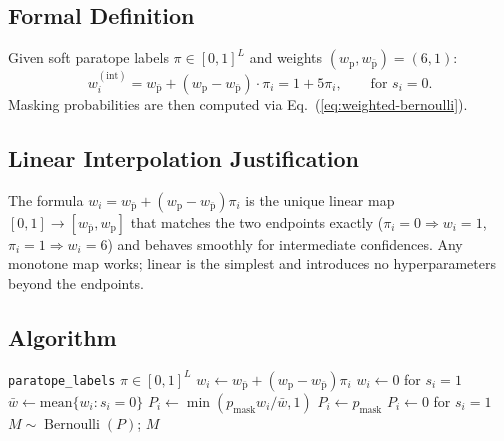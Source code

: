 \documentclass[11pt]{article}
\newcommand{\pmask}{p_{\text{mask}}}
\DeclareMathOperator{\Bern}{Bernoulli}
\begin{document}
\subsection{Formal Definition}
Given soft paratope labels $\pi \in [0,1]^L$ and weights
$(w_{\text{p}}, w_{\bar{\text{p}}}) = (6, 1)$:
\begin{equation}
w^{(\text{int})}_i = w_{\bar{\text{p}}} + (w_{\text{p}} - w_{\bar{\text{p}}}) \cdot \pi_i
= 1 + 5 \pi_i, \qquad \text{for } s_i = 0.
\end{equation}
Masking probabilities are then computed via
Eq.~(\ref{eq:weighted-bernoulli}).

\subsection{Linear Interpolation Justification}
The formula $w_i = w_{\bar{\text{p}}} + (w_{\text{p}} - w_{\bar{\text{p}}}) \pi_i$
is the unique linear map $[0,1] \to [w_{\bar{\text{p}}}, w_{\text{p}}]$
that matches the two endpoints exactly ($\pi_i = 0 \Rightarrow w_i = 1$,
$\pi_i = 1 \Rightarrow w_i = 6$) and behaves smoothly for intermediate
confidences. Any monotone map works; linear is the simplest and
introduces no hyperparameters beyond the endpoints.

\subsection{Algorithm}
\begin{algorithm}[H]
\caption{Interface Masking}
\begin{algorithmic}[1]
\Require \texttt{paratope\_labels} $\pi \in [0,1]^L$
 \Return {} \EndIf
\State $w_i \gets w_{\bar{\text{p}}} + (w_{\text{p}} - w_{\bar{\text{p}}}) \pi_i$
\State $w_i \gets 0$ for $s_i = 1$
\State $\bar w \gets \text{mean}\{w_i : s_i = 0\}$
  \State $P_i \gets \min(\pmask w_i / \bar w, 1)$
\Else
  \State $P_i \gets \pmask$
\EndIf
\State $P_i \gets 0$ for $s_i = 1$
\State $M \sim \Bern(P)$; \Return $M$
\end{algorithmic}
\end{algorithm}
\end{document}
